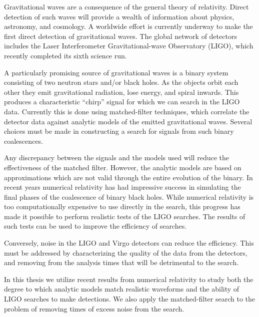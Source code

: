 \documentclass[12pt,notitlepage]{report}
\begin{document}
\pagestyle{empty}
\vspace*{5in}
\newpage




Gravitational waves are a consequence of the general theory of
relativity.  Direct detection of such waves will provide a wealth of
information about physics, astronomy, and cosmology.  A worldwide
effort is currently underway to make the first  direct detection of
gravitational waves.  The global network of detectors includes the
Laser Interferometer Gravitational-wave Observatory (LIGO), which
recently completed its sixth science run.

A particularly promising source of gravitational waves is a binary
system consisting of two neutron stars and/or black holes.  As the
objects orbit each other they emit gravitational radiation, lose
energy, and spiral inwards.  This produces a characteristic ``chirp''
signal for which we can search in the LIGO data.  Currently this is
done using matched-filter techniques, which correlate the detector
data against analytic models of the emitted gravitational waves.
Several choices must be made in constructing a search for signals from
such binary coalescences. 

Any discrepancy between the signals and the models used will reduce
the effectiveness of the matched filter.  However, the analytic models
are based on approximations which are not valid through the entire
evolution of the binary.  In recent years numerical relativity has had
impressive success in simulating the final phases of the coalescence
of binary black holes.  While numerical relativity is too
computationally expensive to use directly in the search, this progress
has made it possible to perform realistic tests of the LIGO searches.
The results of such tests can be used to improve the efficiency of
searches.

Conversely, noise in the LIGO and Virgo detectors can reduce the
efficiency.  This must be addressed by characterizing the quality of
the data from the detectors, and removing from the analysis times that
will be detrimental to the search.

In this thesis we utilize recent results from numerical relativity to
study both the degree to which analytic models match realistic
waveforms and the ability of LIGO searches to make detections.  We
also apply the matched-filter search to the problem of removing times
of excess noise from the search.
\end{document}
